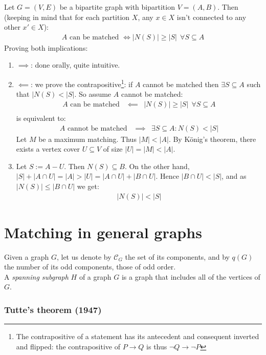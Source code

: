 \documentclass[11pt]{book}
\begin{document}
Let $G = (V, E)$ be a bipartite graph with bipartition $V = (A, B)$. Then (keeping in mind that for each partition $X$, any $x \in X$ isn't connected to any other $x' \in X$):
\begin{eqnarray}
	A \text{ can be matched } \iff |N(S)| \geq |S| ~~\forall S \subseteq A
\end{eqnarray} 
Proving both implications:
\begin{enumerate}
	\item $\implies$: done orally, quite intuitive.
	\item $\impliedby$: we prove the contrapositive\footnote{The contrapositive of a statement has its antecedent and consequent inverted and flipped: the contrapositive of $P \rightarrow Q$ is thus $\neg Q \rightarrow \neg P$}: if $A$ cannot be matched then $\exists S \subseteq A$ such that $|N(S) < |S|$. So assume $A$ cannot be matched:
		\begin{eqnarray}
			A \text{ can be matched } &\impliedby& |N(S)| \geq |S| ~~\forall S \subseteq A \\
		\end{eqnarray}
		is equivalent to:
		\begin{eqnarray}
			A \text{ cannot be matched } &\implies& \exists S \subseteq A : N(S) < |S|
		\end{eqnarray} Let $M$ be a maximum matching. Thus $|M| < |A|$. By König's theorem, there exists a vertex cover $U \subseteq V$ of size $|U| = |M| < |A|$.
	\item Let $S := A - U$. Then $N(S) \subseteq B$. On the other hand, $|S| + |A \cap U| = |A| > |U| = |A \cap U| + |B \cap U|$. Hence $|B \cap U| < |S|$, and as $|N(S)| \leq |B \cap U|$ we get:
		\begin{eqnarray}
			|N(S)| < |S|
		\end{eqnarray}
\end{enumerate}

	\section{Matching in general graphs}
		Given a graph $G$, let us denote by $\mathcal{C}_G$ the set of its components, and by $q(G)$ the number of its odd components, those of odd order.\\
		
		A \textit{spanning subgraph} $H$ of a graph $G$ is a graph that includes all of the vertices of $G$. 


		\subsubsection{Tutte's theorem (1947)} 
		
\end{document}

